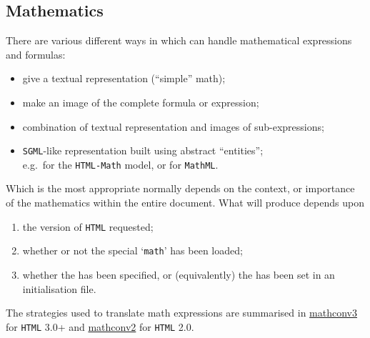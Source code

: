 \subsection{Mathematics\label{maths}}
%
There are various different ways in which \latextohtml{} can handle
mathematical expressions and formulas:
\begin{itemize}
\item
give a textual representation (``simple'' math);
\item
make an image of the complete formula or expression;
\item
combination of textual representation and images of
sub-expressions;
\item
\texttt{SGML}-like representation built using abstract ``entities'';\\
e.g.\ for the \texttt{HTML-Math} model, or for \texttt{MathML}.
%
\end{itemize}
Which is the most appropriate normally depends on the context,
or importance of the mathematics within the entire document.
What \latextohtml{} will produce depends upon
\begin{enumerate}
\item 
the version of \texttt{HTML} requested;
\item
whether or not the special `\texttt{math}'  has been loaded;
\item
whether the  
has been specified, or (equivalently) the  
 has been set in an initialisation file.
\end{enumerate}
%
The strategies used to translate math expressions are summarised
in \hyperref{the table below}{Table~}{}{mathconv3} for \texttt{HTML} 3.0+
and \hyperref{the subsequent table}{Table~}{}{mathconv2} for \texttt{HTML} 2.0.

